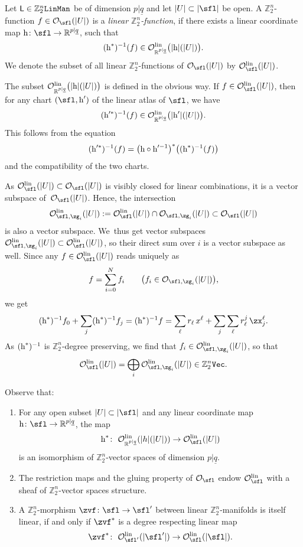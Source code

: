 \documentclass[pdftex]{sigma}%
\newcommand{\rmh}{\textnormal{h}}
\newcommand{\op}[1]{\operatorname{#1}}
\newcommand{\R}{{\mathbb R}}
\newcommand{\Z}{{\mathbb Z}}
\def\ul{\underline}
\def\cO{\mathcal{O}}
\def\ul{\underline}
\newcommand{\0}{\otimes}
\newcommand{\z}{\Z_2^n}
\numberwithin{equation}{section}
\begin{document}
\begin{Definition}
Let $\textsf{L}\in\z\tt LinMan$ be of dimension $p|\ul q$ and let $|U|\subset|\sfl|$ be open. A $\z$-function $f\in\cO_\sfl(|U|)$ is a {\it linear $\z$-function}, if there exists a linear coordinate map $\rmh\colon \sfl\to \R^{p|\ul q}$, such that
\[
(\rmh^*)^{-1}(f)\in\cO^{\op{lin}}_{\R^{p|\ul q}}\big(|\rmh|(|U|)\big).
\]
We denote the subset of all linear $\z$-functions of $\cO_\sfl(|U|)$ by $\cO_\sfl^{\op{lin}}(|U|)$. \end{Definition}

The subset $\cO_{\R^{p|\ul q}}^{\op{lin}}\big(|\rmh|(|U|)\big)$ is defined in the obvious way. If $f\in\cO_\sfl^{\op{lin}}(|U|)$, then for any chart $(\sfl,\rmh')$ of the linear atlas of $\sfl$, we have
\[
(\rmh'^*)^{-1}(f)\in\cO^{\op{lin}}_{\R^{p|\ul q}}\big(|\rmh'|(|U|)\big).
\]
This follows from the equation
\[
(\rmh'^*)^{-1}(f)=\big(\rmh\circ\rmh'^{-1}\big)^*\big((\rmh^*)^{-1}(f)\big)
\]
and the compatibility of the two charts.

As $\cO_{\sfl}^{\op{lin}}(|U|)\subset\cO_{\sfl}(|U|)$ is visibly closed for linear combinations, it is a vector subspace of~$\cO_\sfl(|U|)$. Hence, the intersection
\[
\cO_{\sfl,\zg_i}^{\op{lin}}(|U|):=\cO_{\sfl}^{\op{lin}}(|U|)\cap\cO_{\sfl,\zg_i}(|U|)\subset\cO_\sfl(|U|)
\]
is also a vector subspace. We~thus get vector subspaces $\cO^{\op{lin}}_{\sfl,\zg_i}(|U|)\subset\cO^{\op{lin}}_\sfl(|U|)$, so their direct sum over $i$ is a vector subspace as well. Since any $f\in\cO^{\op{lin}}_\sfl(|U|)$ reads uniquely as
\[
f=\sum_{i=0}^Nf_i\qquad \big(f_i\in\cO_{\sfl,\zg_i}(|U|)\big),
\]
we get
\[
(\rmh^*)^{-1}f_0+\sum_j(\rmh^*)^{-1}f_j=(\rmh^*)^{-1}f=\sum_\ell r_\ell\, x^\ell+\sum_j\sum_\ell r^j_\ell\,\zx^\ell_j.
\]
As $(\rmh^*)^{-1}$ is $\z$-degree preserving, we find that $f_i\in\cO^{\op{lin}}_{\sfl,\zg_i}(|U|)$, so that
\[
\cO^{\op{lin}}_\sfl(|U|)=\bigoplus_i\cO^{\op{lin}}_{\sfl,\zg_i}(|U|)\in\z\tt Vec.
\]

\begin{Remark}\label{RemLinFct} Observe that:
\begin{enumerate}\itemsep=0pt
\item[$(i)$] For any open subset $|U|\subset|\sfl|$ and any linear coordinate map $\rmh\colon \sfl\to\R^{p|\ul q}$, the map
\[
\rmh^*\colon\ \cO^{\op{lin}}_{\R^{p|\ul q}}(|h|(|U|))\to \cO^{\op{lin}}_\sfl(|U|)
\]
is an isomorphism of $\z$-vector spaces of dimension $p|\ul q$.
\item[$(ii)$] The restriction maps and the gluing property of $\cO_\sfl$ endow $\cO^{\op{lin}}_\sfl$ with a sheaf of $\z$-vector spaces structure.
\item[$(iii)$] A $\z$-morphism $\zvf\colon \sfl\to\sfl'$ between linear $\z$-manifolds is itself linear, if and only if $\zvf^*$ is a degree respecting linear map
\[
\zvf^*\colon\ \cO^{\op{lin}}_{\sfl'}(|\sfl'|)\to\cO^{\op{lin}}_{\sfl}(|\sfl|).
\]
\end{enumerate}\end{Remark}
\end{document}
